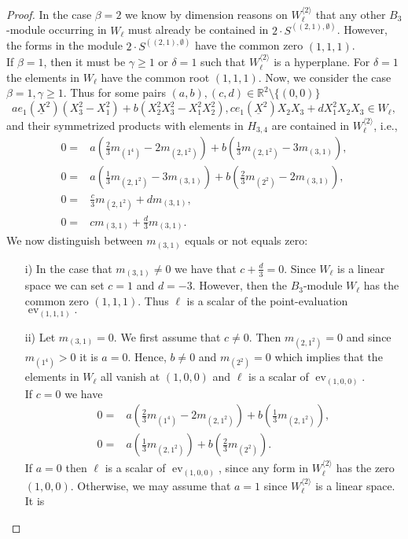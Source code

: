 \documentclass[11pt,a4paper]{amsart}
\numberwithin{equation}{section}
\theoremstyle{definition}
\newcommand{\R}{\mathbb{R}}
\DeclareMathOperator{\ev}{ev}
\numberwithin{thm}{section}
\theoremstyle{break}
\numberwithin{subcase}{case}
\begin{document}
 \begin{proof}
 In the case $\beta = 2$ we know by dimension reasons on $W_\ell^{\langle 2 \rangle}$ that any other $B_3$-module occurring in $W_\ell$ must already be contained in $2 \cdot S^{((2,1),\emptyset)}$. However, the forms in the module $2 \cdot S^{((2,1),\emptyset)}$ have the common zero $(1,1,1)$. \\
 If $\beta = 1$, then it must be $\gamma \geq 1$ or $\delta = 1$ such that $W_\ell^{\langle 2 \rangle}$ is a hyperplane. For $\delta = 1$ the elements in $W_\ell$ have the common root $(1,1,1)$. Now, we consider the case $\beta = 1,\gamma \geq 1$. Thus for some pairs $(a,b),(c,d) \in \R^2\setminus\{(0,0)\}$ $$ae_1(\underline{X}^2)(X_3^2-X_1^2)+b(X_2^2X_3^2-X_1^2X_2^2),ce_1(\underline{X}^2)X_2X_3+d X_1^2X_2X_3 \in W_\ell,$$ and their symmetrized products with elements in $H_{3,4}$ are contained in $W_\ell^{\langle 2 \rangle}$, i.e., 
 \begin{align*}
 0=& a\left(\frac{2}{3}m_{(1^4)}-2m_{(2,1^2)}\right) + b \left( \frac{1}{3}m_{(2,1^2)}-3m_{(3,1)} \right),  \\ 
 0=& a\left( \frac{1}{3}m_{(2,1^2)}-3m_{(3,1)}\right) + b \left( \frac{2}{3}m_{(2^2)}-2m_{(3,1)} \right), \\
 0=&\frac{c}{3}m_{(2,1^2)}+dm_{(3,1)}, \\
 0=& cm_{(3,1)}+\frac{d}{3}m_{(3,1)}. 
 \end{align*}
  We now distinguish between $m_{(3,1)}$ equals or not equals zero:
 \begin{itemize}
     \item[i)] In the case that $m_{(3,1)} \neq 0$ we have that $c + \frac{d}{3}=0$. Since $W_\ell$ is a linear space we can set $c=1$ and $d=-3$. However, then the $B_3$-module $W_\ell$ has the common zero $(1,1,1)$. Thus $\ell$ is a scalar of the point-evaluation $\ev_{(1,1,1)}.$ 
     \item[ii)] Let $m_{(3,1)} =0$. We first assume that $c \neq 0$. Then $m_{(2,1^2)} = 0$ and since $m_{(1^4)} >0$ it is $a=0.$ Hence, $b \neq 0$ and $m_{(2^2)}=0$ which implies that the elements in $W_\ell$ all vanish at $(1,0,0)$ and $\ell$ is a scalar of $\ev_{(1,0,0)}$. \\
     If $c = 0$ we have \begin{align*}
    0=&  a\left(\frac{2}{3}m_{(1^4)}-2m_{(2,1^2)}\right) + b \left( \frac{1}{3}m_{(2,1^2)} \right), \\ 
    0=& a\left( \frac{1}{3}m_{(2,1^2)}\right) + b \left( \frac{2}{3}m_{(2^2)} \right). 
 \end{align*} If $a = 0$ then $\ell$ is a scalar of $\ev_{(1,0,0)}$, since any form in $W_\ell^{\langle 2 \rangle}$ has the zero $(1,0,0)$. Otherwise, we may assume that $a=1$ since $W_\ell^{\langle 2 \rangle}$ is a linear space. It is 

\end{itemize}
\end{proof}
\end{document}

